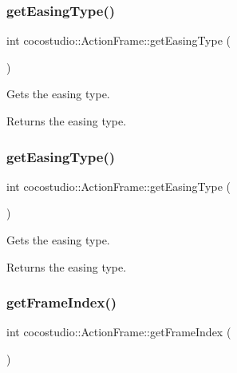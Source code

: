 \subsubsection{\texorpdfstring{get\+Easing\+Type()}{getEasingType()}\hspace{0.1cm}{\footnotesize\ttfamily [1/2]}}
{\footnotesize\ttfamily int cocostudio\+::\+Action\+Frame\+::get\+Easing\+Type (\begin{DoxyParamCaption}{ }\end{DoxyParamCaption})}

Gets the easing type.

\begin{DoxyReturn}{Returns}
the easing type. 
\end{DoxyReturn}
\mbox{\label{classcocostudio_1_1ActionFrame_ac9cbd5d9b6751f4802b83a35941b680f}} 
\subsubsection{\texorpdfstring{get\+Easing\+Type()}{getEasingType()}\hspace{0.1cm}{\footnotesize\ttfamily [2/2]}}
{\footnotesize\ttfamily int cocostudio\+::\+Action\+Frame\+::get\+Easing\+Type (\begin{DoxyParamCaption}{ }\end{DoxyParamCaption})}

Gets the easing type.

\begin{DoxyReturn}{Returns}
the easing type. 
\end{DoxyReturn}
\mbox{\label{classcocostudio_1_1ActionFrame_ac0a9d3c72983fed42f1a8822a0375499}} 
\subsubsection{\texorpdfstring{get\+Frame\+Index()}{getFrameIndex()}\hspace{0.1cm}{\footnotesize\ttfamily [1/2]}}
{\footnotesize\ttfamily int cocostudio\+::\+Action\+Frame\+::get\+Frame\+Index (\begin{DoxyParamCaption}{ }\end{DoxyParamCaption})}

